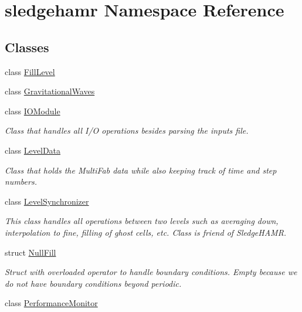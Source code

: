 \hypertarget{namespacesledgehamr}{}\section{sledgehamr Namespace Reference}
\label{namespacesledgehamr}
\subsection*{Classes}
\begin{DoxyCompactItemize}
\item 
class \mbox{\hyperlink{classsledgehamr_1_1FillLevel}{Fill\+Level}}
\item 
class \mbox{\hyperlink{classsledgehamr_1_1GravitationalWaves}{Gravitational\+Waves}}
\item 
class \mbox{\hyperlink{classsledgehamr_1_1IOModule}{I\+O\+Module}}
\begin{DoxyCompactList}\small\item\em Class that handles all I/O operations besides parsing the inputs file. \end{DoxyCompactList}\item 
class \mbox{\hyperlink{classsledgehamr_1_1LevelData}{Level\+Data}}
\begin{DoxyCompactList}\small\item\em Class that holds the Multi\+Fab data while also keeping track of time and step numbers. \end{DoxyCompactList}\item 
class \mbox{\hyperlink{classsledgehamr_1_1LevelSynchronizer}{Level\+Synchronizer}}
\begin{DoxyCompactList}\small\item\em This class handles all operations between two levels such as averaging down, interpolation to fine, filling of ghost cells, etc. Class is friend of Sledge\+H\+A\+MR. \end{DoxyCompactList}\item 
struct \mbox{\hyperlink{structsledgehamr_1_1NullFill}{Null\+Fill}}
\begin{DoxyCompactList}\small\item\em Struct with overloaded operator to handle boundary conditions. Empty because we do not have boundary conditions beyond periodic. \end{DoxyCompactList}\item 
class \mbox{\hyperlink{classsledgehamr_1_1PerformanceMonitor}{Performance\+Monitor}}
\item 

\end{DoxyCompactItemize}
